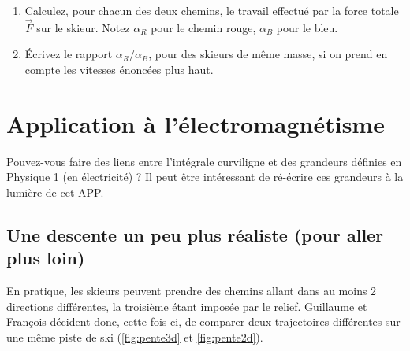 \documentclass{cup-pan}
\begin{document}
\vspace{\baselineskip}


\vspace{\baselineskip}
\questions
\begin{enumerate}
    \item Calculez, pour chacun des deux chemins, le travail effectué par la force totale $\vec{F}$ sur le skieur. Notez $\alpha_R$ pour le chemin rouge, $\alpha_B$ pour le bleu.
    \item Écrivez le rapport $\alpha_R/\alpha_B$, pour des skieurs de même masse, si on prend en compte les vitesses énoncées plus haut. 
\end{enumerate}


\section*{Application à l'électromagnétisme}

Pouvez-vous faire des liens entre l'intégrale curviligne et des grandeurs définies en Physique 1 (en électricité) ? Il peut être intéressant de ré-écrire ces grandeurs à la lumière de cet APP. 

\pagebreak

\subsection{Une descente un peu plus réaliste (pour aller plus loin)}

En pratique, les skieurs peuvent prendre des chemins allant dans au moins 2 directions différentes, la troisième étant imposée par le relief. Guillaume et François décident donc, cette fois-ci, de comparer deux trajectoires différentes sur une même piste de ski (\autoref{fig:pente3d} et \autoref{fig:pente2d}).
\end{document}
